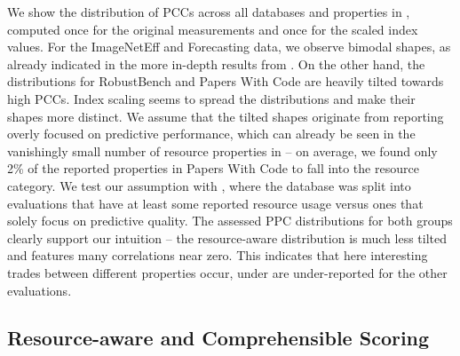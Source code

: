 \documentclass[sn-mathphys,Numbered]{sn-jnl}%
\theoremstyle{thmstylethree}%
\begin{document}
We show the distribution of PCCs across all databases and properties in , computed once for the original measurements and once for the scaled index values.
For the ImageNetEff and Forecasting data, we observe bimodal shapes, as already indicated in the more in-depth results from .
On the other hand, the distributions for RobustBench and Papers With Code are heavily tilted towards high PCCs.
Index scaling seems to spread the distributions and make their shapes more distinct. 
We assume that the tilted shapes originate from reporting overly focused on predictive performance, which can already be seen in the vanishingly small number of resource properties in  -- on average, we found only 2\% of the reported properties in Papers With Code to fall into the resource category.
We test our assumption with , where the database was split into evaluations that have at least some reported resource usage versus ones that solely focus on predictive quality.
The assessed PPC distributions for both groups clearly support our intuition -- the resource-aware distribution is much less tilted and features many correlations near zero.
This indicates that here interesting trades between different properties occur, under are under-reported for the other evaluations.

\subsection{Resource-aware and Comprehensible Scoring}
\end{document}
